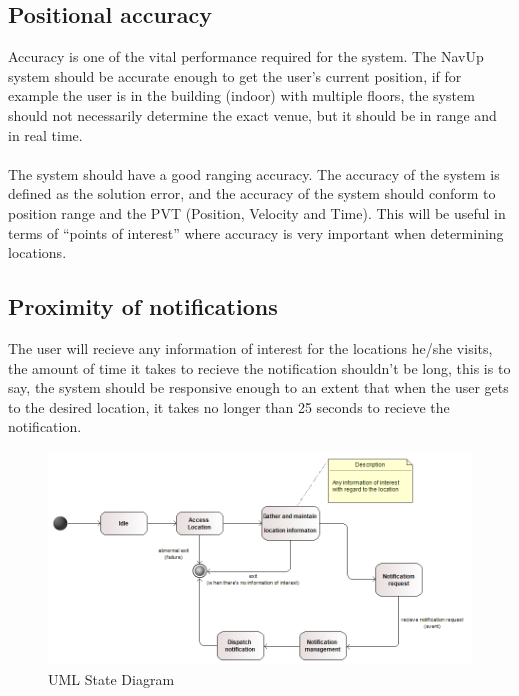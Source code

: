 	\subsection{Positional accuracy}
	Accuracy is one of the vital performance required for the system. The NavUp 
	system should be accurate enough to get the user’s current position, if for 
	example the user is in the building (indoor) with multiple floors, the system 
	should not necessarily determine the exact venue, but it should be in range and 
	in real time.\\\\ The system should have a good ranging accuracy. The accuracy of the 
	system is defined as the solution error, and the accuracy of the system should conform 
	to position range and the PVT (Position, Velocity and Time). This will be useful in 
	terms of “points of interest” where accuracy is very important when determining locations.
	\subsection{Proximity of notifications}
	The user will recieve any information of interest for the locations he/she visits, the amount
	of time it takes to recieve the notification shouldn't be long, this is to say, the system should 
	be responsive enough to an extent that when the user gets to the desired location, it takes no longer 
	than 25 seconds to recieve the notification.
  
	\begin{figure}[H]\includegraphics[width=\textwidth]{StateDiagram}
	\caption{UML State Diagram}
	\end{figure}
		

